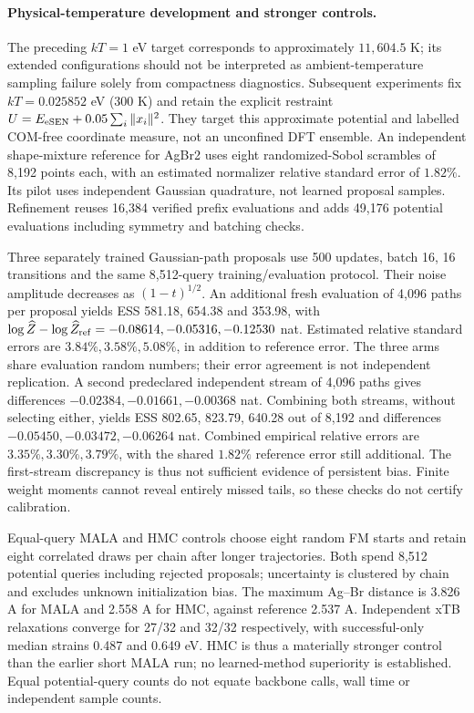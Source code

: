 \paragraph{Physical-temperature development and stronger controls.}
The preceding $kT=1$ eV target corresponds to approximately $11{,}604.5$ K;
its extended configurations should not be interpreted as ambient-temperature
sampling failure solely from compactness diagnostics. Subsequent experiments
fix $kT=0.025852$ eV (300 K) and retain the explicit restraint
$U=E_{\rm eSEN}+0.05\sum_i\|x_i\|^2$. They target this approximate potential
and labelled COM-free coordinate measure, not an unconfined DFT ensemble.
An independent shape-mixture reference for AgBr2 uses eight randomized-Sobol
scrambles of 8,192 points each, with an estimated normalizer relative standard
error of $1.82\%$. Its pilot uses independent Gaussian quadrature, not learned
proposal samples. Refinement reuses 16,384 verified prefix evaluations and adds
49,176 potential evaluations including symmetry and batching checks.

Three separately trained Gaussian-path proposals use 500 updates, batch 16,
16 transitions and the same 8,512-query training/evaluation protocol. Their
noise amplitude decreases as $(1-t)^{1/2}$. An additional fresh evaluation of
4,096 paths per proposal yields ESS 581.18, 654.38 and 353.98, with
$\log\widehat Z-\log\widehat Z_{\rm ref}=-0.08614,-0.05316,-0.12530$ nat.
Estimated relative standard errors are $3.84\%,3.58\%,5.08\%$, in addition to
reference error. The three arms share evaluation random numbers; their error
agreement is not independent replication. A second predeclared independent
stream of 4,096 paths gives differences $-0.02384,-0.01661,-0.00368$ nat.
Combining both streams, without selecting either, yields ESS 802.65, 823.79,
640.28 out of 8,192 and differences $-0.05450,-0.03472,-0.06264$ nat.
Combined empirical relative errors are $3.35\%,3.30\%,3.79\%$, with the shared
$1.82\%$ reference error still additional. The first-stream discrepancy is thus
not sufficient evidence of persistent bias. Finite weight moments cannot reveal
entirely missed tails, so these checks do not certify calibration.

Equal-query MALA and HMC controls choose eight random FM starts and retain
eight correlated draws per chain after longer trajectories. Both spend 8,512
potential queries including rejected proposals; uncertainty is clustered by
chain and excludes unknown initialization bias. The maximum Ag--Br distance
is 3.826 A for MALA and 2.558 A for HMC, against reference 2.537 A.
Independent xTB relaxations converge for 27/32 and 32/32 respectively, with
successful-only median strains 0.487 and 0.649 eV. HMC is thus a materially
stronger control than the earlier short MALA run; no learned-method superiority
is established. Equal potential-query counts do not equate backbone calls,
wall time or independent sample counts.

